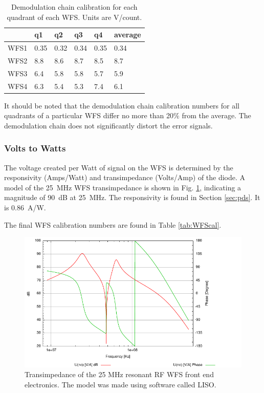 \begin{table}
\centering
\caption[Demodulation chain calibration for each quadrant of each
 WFS]{Demodulation chain calibration for each quadrant of each
 WFS. Units are \micro V/count.}
\begin{tabular}{l l l l l l}
\hline
 & q1 & q2 & q3 & q4 & average \\
\hline
 WFS1  & 0.35 &   0.32 &   0.34 &   0.35 & 0.34 \\
 WFS2  & 8.8 &   8.6 &   8.7  &  8.5 & 8.7       \\
 WFS3  & 6.4 &   5.8 &   5.8 &   5.7 & 5.9     \\
 WFS4  & 6.3 &   5.4 &   5.3  &  7.4 & 6.1    \\
\hline
\end{tabular}
\label{table:demodcal}
\end{table}

It should be noted that the demodulation chain calibration numbers for
all quadrants of a particular WFS differ no more than 20\% from the
average. The demodulation chain does not significantly distort the
error signals.


\subsubsection{Volts to Watts}
The voltage created per Watt of signal on the WFS is determined by the
responsivity (Amps/Watt) and transimpedance (Volts/Amp) of the
diode. A model of the 25~MHz WFS transimpedance is shown in
Fig. \ref{fig:wfs25MHzTF}, indicating a magnitude of 90~dB at
25~MHz. The responsivity is found in Section \ref{sec:pds}. It is
0.86~A/W. 

The final WFS calibration numbers are found in Table \ref{tab:WFScal}.

\begin{figure}
\begin{centering}
\includegraphics[width=1.0\textwidth]{figures/wfs25MHzTF.pdf}
\caption{Transimpedance of the 25 MHz resonant RF WFS front end
  electronics. The model was made using software called LISO.}
\label{fig:wfs25MHzTF}
\end{centering}
\end{figure}

